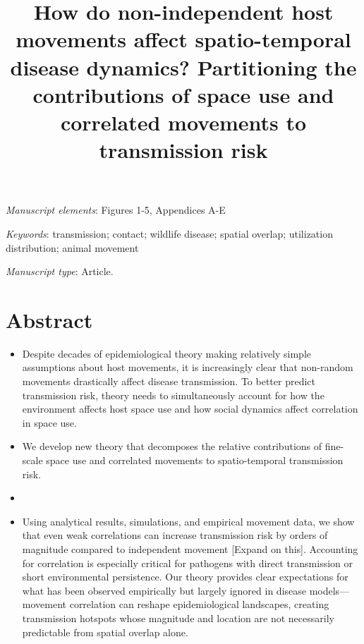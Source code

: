 ﻿\documentclass[11pt]{article}
\title{How do non-independent host movements affect spatio-temporal disease dynamics? Partitioning the contributions of space use and correlated movements to transmission risk}
\date{}
\begin{document}
\maketitle



\bigskip

\textit{Manuscript elements}: Figures 1-5, Appendices A-E 

\bigskip

\textit{Keywords}: transmission; contact; wildlife disease; spatial overlap; utilization distribution; animal movement

\bigskip

\textit{Manuscript type}: Article. %

\bigskip


\linenumbers{}
\modulolinenumbers[3]

\newpage{}

\section*{Abstract}

\begin{itemize}


    \item Despite decades of epidemiological theory making relatively simple assumptions about host movements, it is increasingly clear that non-random movements drastically affect disease transmission. To better predict transmission risk, theory needs to simultaneously account for how the environment affects host space use and how social dynamics affect correlation in space use. 

    \item We develop new theory that decomposes the relative contributions of fine-scale space use and correlated movements to spatio-temporal transmission risk.

    \item 

    \item Using analytical results, simulations, and empirical movement data, we show that even weak correlations can increase transmission risk by orders of magnitude compared to independent movement [Expand on this]. Accounting for correlation is especially critical for pathogens with direct transmission or short environmental persistence. Our theory provides clear expectations for what has been observed empirically but largely ignored in disease models---movement correlation can reshape epidemiological landscapes, creating transmission hotspots whose magnitude and location are not necessarily predictable from spatial overlap alone.

\end{itemize}
\end{document}
